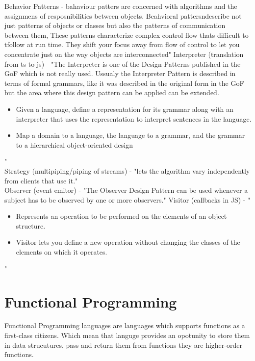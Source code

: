 Behavior Patterns - bahaviour patters are concerned with algorithms and the assignmens of resposnibilities between objects. Beahvioral pattersndescribe not just patterns of objects or classes but also the patterns of communication between them, These patterns characterize complex control flow thats difficult to tfollow at run time. They shift your focus away from flow of control to let you concentrate just on the way objects are interconnected"\cite{DesignPatterns}
Interpreter (translation from ts to js) - "The Interpreter is one of the Design Patterns published in the GoF which is not really used. Ussualy the Interpreter Pattern is described in terms of formal grammars, like it was described in the original form in the GoF but the area where this design pattern can be applied can be extended.
\begin{itemize}
\item Given a language, define a representation for its grammar along with an interpreter that uses the representation to interpret sentences in the language.
\item Map a domain to a language, the language to a grammar, and the grammar to a hierarchical object-oriented design
\end{itemize}"\cite{oosite}\\
Strategy (multipiping/piping of streams) - "lets the algorithm vary independently from clients that use it."\cite{oosite}\\
Observer (event emitor) - "The Observer Design Pattern can be used whenever a subject has to be observed by one or more observers."\cite{oosite}
Visitor (callbacks in JS) - "\begin{itemize}
\item Represents an operation to be performed on the elements of an object structure.
\item Visitor lets you define a new operation without changing the classes of the elements on which it operates.
\end{itemize}
"\cite{oosite}\\


\section{Functional Programming}
Functional Programming languages are languages which supports functions as a first-class citizens. Which mean that languge provides an opotunity to store them in data strucutures, pass and return them from functions they are higher-order functions\cite{Hudak}.


